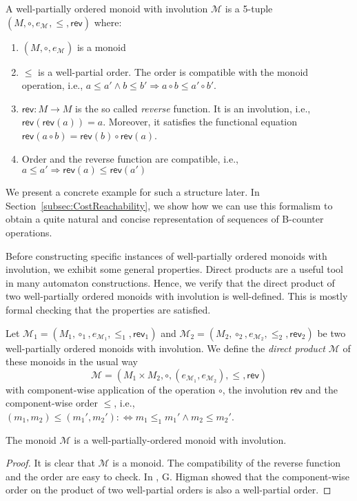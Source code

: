\documentclass{LMCS}
\newcommand{\defEquiv}{:\Leftrightarrow}
\newcommand{\Implies}{\Rightarrow}
\newcommand{\rev}{\mathsf{rev}}
\newcommand{\annotationMonoidM}{\mathcal M}
\newcommand{\neutralM}[1][]{e_{\annotationMonoidM_{#1}}}
\begin{document}
\begin{defi}
	A well-partially ordered monoid with involution $\annotationMonoidM$
    is a 5-tuple  $(M,\circ,\neutralM,\le,\rev)$ where:
	\begin{enumerate}[label=(\roman*)]
		\item $(M,\circ,\neutralM)$ is a monoid
		\item $\le$ is a well-partial order. The order is compatible with the
           monoid operation, i.e., $a \le a' \wedge b \le b' \Implies a \circ b
            \le a' \circ b'$.
		\item $\rev: M \to M$ is the so called \emph{reverse} function. It is
an involution, i.e., $\rev(\rev(a)) = a$. Moreover, it satisfies the functional
equation $\rev(a \circ b) = \rev(b) \circ \rev(a)$.
		\item Order and the reverse function are compatible, i.e., $a \le a'
\Implies \rev(a) \le \rev(a')$ 
	\end{enumerate}
\end{defi}

\noindent We present a concrete example for such a structure later. In
Section~\ref{subsec:CostReachability}, we show how we can use this
formalism to obtain a quite natural and concise representation of sequences of B-counter operations. 

Before constructing specific instances of well-partially ordered monoids with involution,
we exhibit some general properties. Direct products are a useful tool
in many automaton constructions. Hence, we verify that the direct product of two
well-partially ordered monoids with involution is well-defined. This is
mostly formal checking that the properties are satisfied. 

\begin{lem}\label{lem:ProductOfRIOrderedMisRIOrderedM}
	Let $\annotationMonoidM_1 = (M_1,\circ_1,\neutralM[1],\le_1,\rev_1)$ and
$\annotationMonoidM_2 = (M_2,\circ_2,\neutralM[2],\le_2,\rev_2)$ be two
well-partially ordered monoids with involution. We define the
\emph{direct product} $\annotationMonoidM$ of these monoids in the usual way 
\[ \annotationMonoidM = (M_1 \times
M_2,\circ,(\neutralM[1],\neutralM[2]),\le,\rev)
\]
  with component-wise application of the operation $\circ$, the
involution $\rev$ and the compo\-nent-wise order $\le$, i.e., $ (m_1,m_2) \le
(m_1',m_2') \defEquiv m_1 \le_1 m_1' \wedge m_2 \le m_2'$.


  The monoid $\annotationMonoidM$ is a well-partially-ordered monoid with
involution.
\end{lem}
\begin{proof}
  It is clear that $\annotationMonoidM$ is a monoid. The compatibility of the
reverse function and the order are easy to check.
  In \cite{Higman52}, G. Higman showed that the component-wise order on the
product of two well-partial orders is also a well-partial order.
\end{proof}
\end{document}
